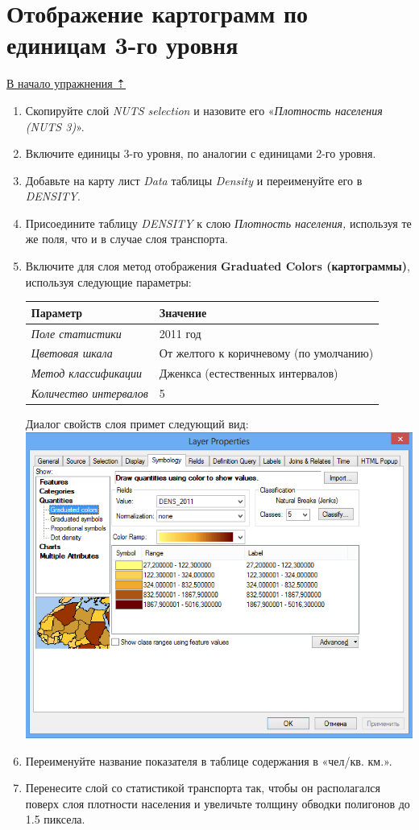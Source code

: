 \documentclass[]{book}
\theoremstyle{definition}
\theoremstyle{definition}
\theoremstyle{definition}
\theoremstyle{remark}
\begin{document}
\hypertarget{stat-map-economic-choropleths3}{%
\section{Отображение картограмм по единицам 3-го
уровня}\label{stat-map-economic-choropleths3}}

\protect\hyperlink{stat-map-economic}{В начало упражнения ⇡}

\begin{enumerate}
\def\labelenumi{\arabic{enumi}.}
\item
  Скопируйте слой \emph{NUTS selection} и назовите его «\emph{Плотность
  населения (NUTS 3)}».
\item
  Включите единицы 3-го уровня, по аналогии с единицами 2-го уровня.
\item
  Добавьте на карту лист \emph{Data} таблицы \emph{Density} и
  переименуйте его в \emph{DENSITY}.
\item
  Присоедините таблицу \emph{DENSITY} к слою \emph{Плотность населения,}
  используя те же поля, что и в случае слоя транспорта.
\item
  Включите для слоя метод отображения \textbf{Graduated Colors
  (картограммы)}, используя следующие параметры:

  \begin{longtable}[]{@{}ll@{}}
  \toprule
  Параметр & Значение\tabularnewline
  \midrule
  \endhead
  \emph{Поле статистики} & 2011 год\tabularnewline
  \emph{Цветовая шкала} & От желтого к коричневому (по
  умолчанию)\tabularnewline
  \emph{Метод классификации} & Дженкса (естественных
  интервалов)\tabularnewline
  \emph{Количество интервалов} & 5\tabularnewline
  \bottomrule
  \end{longtable}

  Диалог свойств слоя примет следующий вид:
  \includegraphics{images/Ex08/image26.png}
\item
  Переименуйте название показателя в таблице содержания в «чел/кв. км.».
\item
  Перенесите слой со статистикой транспорта так, чтобы он располагался
  поверх слоя плотности населения и увеличьте толщину обводки полигонов
  до 1.5 пиксела.
\end{enumerate}
\end{document}
